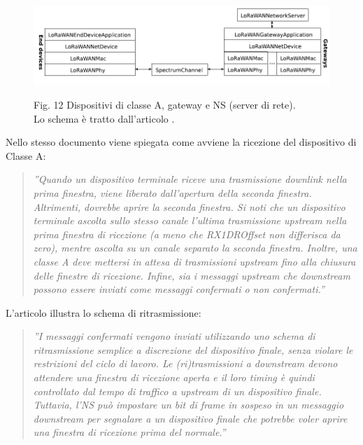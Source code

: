 \documentclass[a4paper]{report} %
\begin{document}
\begin{figure}
\centering
\includegraphics[scale=.5]{Immagini/ClasseA.png}

Fig. 12 Dispositivi di classe A, gateway e NS (server di rete). \\
Lo schema è tratto dall'articolo \cite{art:rif.49}. \\
\end{figure}

Nello stesso documento viene spiegata come avviene la ricezione del dispositivo di Classe A:
\begin{quote}
	\textit{''Quando un dispositivo terminale riceve una trasmissione downlink nella prima finestra, viene liberato dall'apertura della seconda finestra. Altrimenti, dovrebbe aprire la seconda finestra. Si noti che un dispositivo terminale ascolta sullo stesso canale l'ultima trasmissione upstream nella prima finestra di ricezione (a meno che RX1DROffset non differisca da zero), mentre ascolta su un canale separato la seconda finestra. Inoltre, una classe A deve mettersi in attesa di trasmissioni upstream fino alla chiusura delle finestre di ricezione. Infine, sia i messaggi upstream che downstream possono essere inviati come messaggi confermati o non confermati.''} 
\end{quote}
L'articolo \cite{art:rif.49} illustra lo schema di ritrasmissione:
\begin{quote}	
	\textit{''I messaggi confermati vengono inviati utilizzando uno schema di ritrasmissione semplice a discrezione del dispositivo finale, senza violare le restrizioni del ciclo di lavoro. Le (ri)trasmissioni a downstream devono attendere una finestra di ricezione aperta e il loro timing è quindi controllato dal tempo di traffico a upstream di un dispositivo finale. Tuttavia, l'NS può impostare un bit di frame in sospeso in un messaggio downstream per segnalare a un dispositivo finale che potrebbe voler aprire una finestra di ricezione prima del normale.''}
\end{quote}
\end{document}
